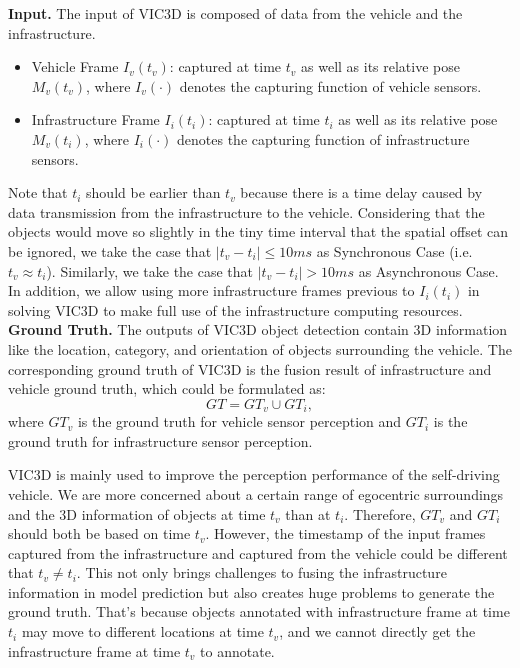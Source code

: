 \noindent \textbf{Input.}
The input of VIC3D is composed of data from the vehicle and the infrastructure. 
\begin{itemize}
    \item Vehicle Frame $I_{v}(t_{v})$: captured at time $t_{v}$ as well as its relative pose $M_{v}(t_{v})$, where $I_{v}(\cdot)$ denotes the capturing function of vehicle sensors.
    \item Infrastructure Frame $I_{i}(t_{i})$: captured at time $t_{i}$ as well as its relative pose $M_{v}(t_{i})$, where $I_{i}(\cdot)$ denotes the capturing function of infrastructure sensors.
\end{itemize}
Note that $t_{i}$ should be earlier than $t_{v}$ because there is a time delay caused by data transmission from the infrastructure to the vehicle.
Considering that the objects would move so slightly in the tiny time interval that the spatial offset can be ignored, we take the case that $|t_v-t_i|\le 10ms$ as Synchronous Case (i.e. $t_v\approx t_i$). 
Similarly, we take the case that $|t_v-t_i|>10ms$ as Asynchronous Case.
In addition, we allow using more infrastructure frames previous to $I_{i}(t_{i})$ in solving VIC3D to make full use of the infrastructure computing resources. \\

\noindent \textbf{Ground Truth.}
The outputs of VIC3D object detection contain 3D information like the location, category, and orientation of objects surrounding the vehicle. 
The corresponding ground truth of VIC3D is the fusion result of infrastructure and vehicle ground truth, which could be formulated as:
\begin{equation}
    GT = GT_{v} \cup GT_{i},
\end{equation}
where $GT_{v}$ is the ground truth for vehicle sensor perception and $GT_{i}$ is the ground truth for infrastructure sensor perception.

VIC3D is mainly used to improve the perception performance of the self-driving vehicle.
We are more concerned about a certain range of egocentric surroundings and the 3D information of objects at time $t_v$ than at $t_i$.
Therefore, $GT_{v}$ and $GT_{i}$ should both be based on time $t_v$.
However, the timestamp of the input frames captured from the infrastructure and captured from the vehicle could be different that $t_v \neq t_i$.
This not only brings challenges to fusing the infrastructure information in model prediction but also creates huge problems to generate the ground truth.
That's because objects annotated with infrastructure frame at time $t_i$ may move to different locations at time $t_v$, and we cannot directly get the infrastructure frame at time $t_v$ to annotate.

